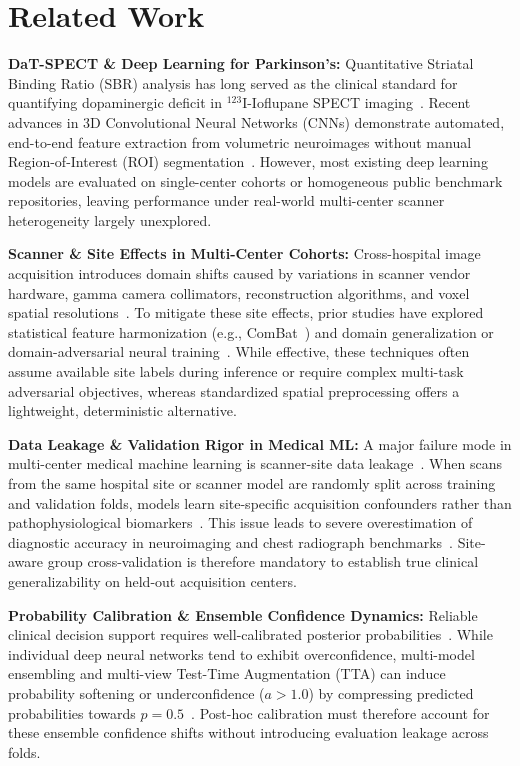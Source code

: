\section{Related Work}
\label{sec:related_work}

\noindent\textbf{DaT-SPECT \& Deep Learning for Parkinson's:} Quantitative Striatal Binding Ratio (SBR) analysis has long served as the clinical standard for quantifying dopaminergic deficit in $^{123}\text{I}$-Ioflupane SPECT imaging~\cite{seibyl1998single}. Recent advances in 3D Convolutional Neural Networks (CNNs) demonstrate automated, end-to-end feature extraction from volumetric neuroimages without manual Region-of-Interest (ROI) segmentation~\cite{korkinof2018high, rahim2019riemannian}. However, most existing deep learning models are evaluated on single-center cohorts or homogeneous public benchmark repositories, leaving performance under real-world multi-center scanner heterogeneity largely unexplored.

\noindent\textbf{Scanner \& Site Effects in Multi-Center Cohorts:} Cross-hospital image acquisition introduces domain shifts caused by variations in scanner vendor hardware, gamma camera collimators, reconstruction algorithms, and voxel spatial resolutions~\cite{glocker2019machine}. To mitigate these site effects, prior studies have explored statistical feature harmonization (e.g., ComBat~\cite{fortin2018harmonization}) and domain generalization or domain-adversarial neural training~\cite{ganin2016domain, dou2019domain, kamnitsas2017unsupervised}. While effective, these techniques often assume available site labels during inference or require complex multi-task adversarial objectives, whereas standardized spatial preprocessing offers a lightweight, deterministic alternative.

\noindent\textbf{Data Leakage \& Validation Rigor in Medical ML:} A major failure mode in multi-center medical machine learning is scanner-site data leakage~\cite{subbanna2021review}. When scans from the same hospital site or scanner model are randomly split across training and validation folds, models learn site-specific acquisition confounders rather than pathophysiological biomarkers~\cite{zech2018variable}. This issue leads to severe overestimation of diagnostic accuracy in neuroimaging and chest radiograph benchmarks~\cite{varoquaux2017cross, wen2020convolutional}. Site-aware group cross-validation is therefore mandatory to establish true clinical generalizability on held-out acquisition centers.

\noindent\textbf{Probability Calibration \& Ensemble Confidence Dynamics:} Reliable clinical decision support requires well-calibrated posterior probabilities~\cite{guo2017calibration}. While individual deep neural networks tend to exhibit overconfidence, multi-model ensembling and multi-view Test-Time Augmentation (TTA) can induce probability softening or underconfidence ($a > 1.0$) by compressing predicted probabilities towards $p=0.5$~\cite{platt1999probabilistic, saeed2022test}. Post-hoc calibration must therefore account for these ensemble confidence shifts without introducing evaluation leakage across folds.

